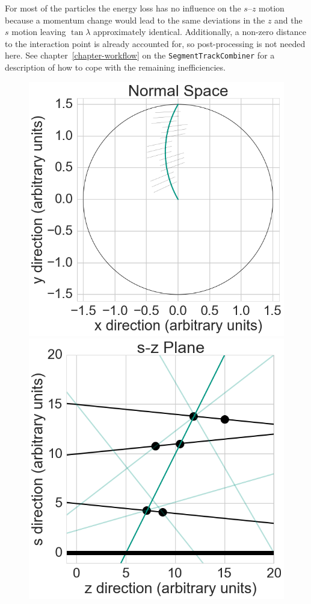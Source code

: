 For most of the particles the energy loss has no influence on the $s$--$z$ motion because a momentum change would lead to the same deviations in the $z$ and the $s$ motion leaving $\tan \lambda$ approximately identical. Additionally, a non-zero distance to the interaction point is already accounted for, so post-processing is not needed here. See chapter~\ref{chapter-workflow} on the \texttt{SegmentTrackCombiner} for a description of how to cope with the remaining inefficiencies.


\begin{figure}
 \centering
 \includegraphics[scale=0.3]{figures/theory/stereo_1.png}
 \hspace*{1cm}
 \includegraphics[scale=0.3]{figures/theory/stereo_2.png}
 

\end{figure}
